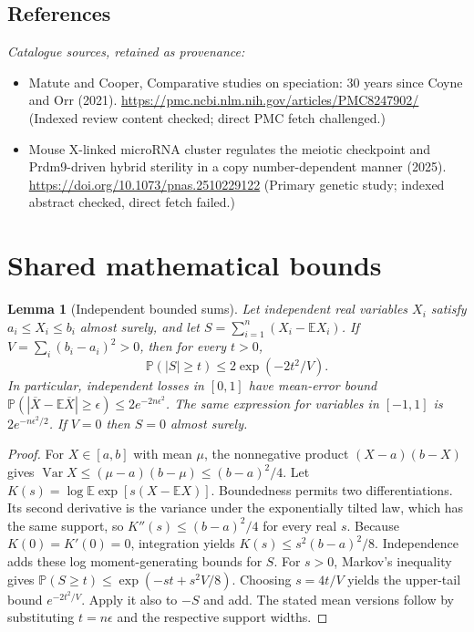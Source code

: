 \documentclass[11pt]{article}
\newcommand{\E}{\mathbb E}
\newcommand{\Prob}{\mathbb P}
\DeclareMathOperator{\Var}{Var}
\providecommand{\E}{\mathbb E}
\providecommand{\Prob}{\mathbb P}
\providecommand{\Var}{\operatorname{Var}}
\newtheorem{sharedlemma}{Lemma}[section]
\begin{document}
\subsection{References}
\noindent\emph{Catalogue sources, retained as provenance:}
\begin{itemize}
\item Matute and Cooper, Comparative studies on speciation: 30 years since Coyne and Orr (2021). \url{https://pmc.ncbi.nlm.nih.gov/articles/PMC8247902/} (Indexed review content checked; direct PMC fetch challenged.)
\item Mouse X-linked microRNA cluster regulates the meiotic checkpoint and Prdm9-driven hybrid sterility in a copy number-dependent manner (2025). \url{https://doi.org/10.1073/pnas.2510229122} (Primary genetic study; indexed abstract checked, direct fetch failed.)
\end{itemize}
\clearpage


\appendix
\section{Shared mathematical bounds}\label{app:bounds}
\begin{sharedlemma}[Independent bounded sums]\label{lem:bounded}
Let independent real variables $X_i$ satisfy $a_i\leq X_i\leq b_i$ almost surely,
and let $S=\sum_{i=1}^n(X_i-\E X_i)$. If
$V=\sum_i(b_i-a_i)^2>0$, then for every $t>0$,
\[
 \Prob(|S|\geq t)\leq 2\exp(-2t^2/V).
\]
In particular, independent losses in $[0,1]$ have mean-error bound
$\Prob(|\overline X-\E\overline X|\geq\epsilon)
\leq2e^{-2n\epsilon^2}$. The same expression for variables in $[-1,1]$
is $2e^{-n\epsilon^2/2}$. If $V=0$ then $S=0$ almost surely.
\end{sharedlemma}
\begin{proof}
For $X\in[a,b]$ with mean $\mu$, the nonnegative product
$(X-a)(b-X)$ gives
$\Var X\leq(\mu-a)(b-\mu)\leq(b-a)^2/4$.
Let $K(s)=\log\E\exp[s(X-\E X)]$.
Boundedness permits two differentiations. Its second derivative is the variance
under the exponentially tilted law, which has the same support, so
$K''(s)\leq(b-a)^2/4$ for every real $s$.
Because $K(0)=K'(0)=0$, integration yields
$K(s)\leq s^2(b-a)^2/8$.
Independence adds these log moment-generating bounds for $S$.
For $s>0$, Markov's inequality gives
$\Prob(S\geq t)\leq\exp(-st+s^2V/8)$.
Choosing $s=4t/V$ yields the upper-tail bound $e^{-2t^2/V}$.
Apply it also to $-S$ and add. The stated mean versions follow by substituting
$t=n\epsilon$ and the respective support widths.
\end{proof}
\end{document}
